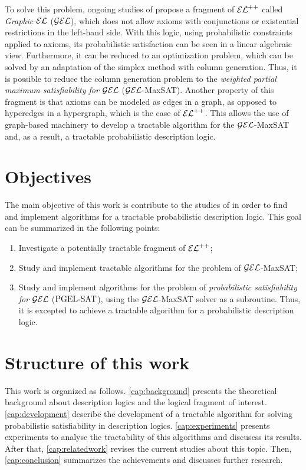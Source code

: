To solve this problem, ongoing studies of \citet{Fin2020} propose a fragment of $\mathcal{EL}^{++}$ called \emph{Graphic $\mathcal{EL}$} ($\mathcal{GEL}$), which does not allow axioms with conjunctions or existential restrictions in the left-hand side. With this logic, using probabilistic constraints applied to axioms, its probabilistic satisfaction can be seen in a linear algebraic view. Furthermore, it can be reduced to an optimization problem, which can be solved by an adaptation of the simplex method with column generation. Thus, it is possible to reduce the column generation problem to the \emph{weighted partial maximum satisfiability for $\mathcal{GEL}$} ($\mathcal{GEL}$-MaxSAT). Another property of this fragment is that axioms can be modeled as edges in a graph, as opposed to hyperedges in a hypergraph, which is the case of $\mathcal{EL}^{++}$. This allows the use of graph-based machinery to develop a tractable algorithm for the $\mathcal{GEL}$-MaxSAT and, as a result, a tractable probabilistic description logic.

\section{Objectives}
The main objective of this work is contribute to the studies of \citet{Fin2020} in order to find and implement algorithms for a tractable probabilistic description logic. This goal can be summarized in the following points: 

\begin{enumerate}
  \item Investigate a potentially tractable fragment of $\mathcal{EL}^{++}$;
  \item Study and implement tractable algorithms for the problem of $\mathcal{GEL}$-MaxSAT;
  \item Study and implement algorithms for the problem of \emph{probabilistic satisfiability for $\mathcal{GEL}$} ($\text{PGEL-SAT}$), using the $\mathcal{GEL}$-MaxSAT solver as a subroutine. Thus, it is excepted to achieve a tractable algorithm for a probabilistic description logic.
\end{enumerate}

\section{Structure of this work}
This work is organized as follows. \cref{cap:background} presents the theoretical background about description logics and the logical fragment of interest. \cref{cap:development} describe the development of a tractable algorithm for solving probabilistic satisfiability in description logics. \cref{cap:experiments} presents experiments to analyse the tractability of this algorithms and discusess its results. After that, \cref{cap:relatedwork} revises the current studies about this topic. Then, \cref{cap:conclusion} summarizes the achievements and discusses further research. 